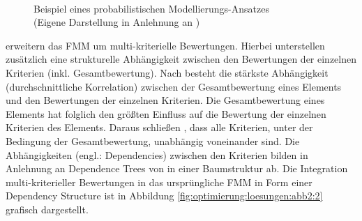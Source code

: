 \begin{figure}[H]
    \centering
    \\
  \caption[Beispiel eines probabilistischen Modellierungs-Ansatzes]{Beispiel eines probabilistischen Modellierungs-Ansatzes\\
	(Eigene Darstellung in Anlehnung an \cite[S. 836]{adomavicius:4:inbook})}\label{fig:optimierung:loesungen:abb2}
\end{figure}

\textcite[S. 235]{sahoo:article} erweitern das \ac{FMM} um multi-kriterielle Bewertungen.
Hierbei unterstellen \textcite[S. 236f.]{sahoo:article} zusätzlich eine strukturelle Abhängigkeit zwischen den Bewertungen der einzelnen Kriterien (inkl. Gesamtbewertung).
Nach \textcite[S. 236f.]{sahoo:article} besteht die stärkste Abhängigkeit (durchschnittliche Korrelation) zwischen der Gesamtbewertung eines Elements und den Bewertungen der einzelnen Kriterien.
Die Gesamtbewertung eines Elements hat folglich den größten Einfluss auf die Bewertung der einzelnen Kriterien des Elements.
Daraus schließen \textcite[S. 236f.]{sahoo:article}, dass alle Kriterien, unter der Bedingung der Gesamtbewertung, unabhängig voneinander sind.
Die Abhängigkeiten (engl.: Dependencies) zwischen den Kriterien bilden \textcite[S. 235]{sahoo:article} in Anlehnung an Dependence Trees von \textcite[S. 463]{chow:article} in einer Baumstruktur ab.
Die Integration multi-kriterieller Bewertungen in das ursprüngliche \ac{FMM} in Form einer Dependency Structure ist in Abbildung \ref{fig:optimierung:loesungen:abb2:2} grafisch dargestellt.

